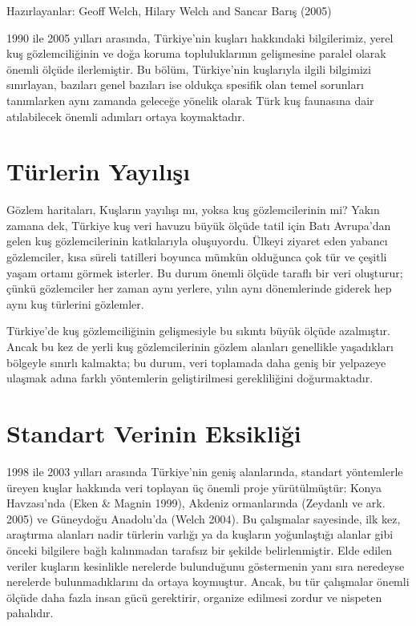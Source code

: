 \documentclass[
  a4paper,
  DIV=11,
  numbers=noendperiod]{scrartcl}
\begin{document}

Hazırlayanlar: Geoff Welch, Hilary Welch and Sancar Barış (2005)

1990 ile 2005 yılları arasında, Türkiye'nin kuşları hakkındaki
bilgilerimiz, yerel kuş gözlemciliğinin ve doğa koruma topluluklarının
gelişmesine paralel olarak önemli ölçüde ilerlemiştir. Bu bölüm,
Türkiye'nin kuşlarıyla ilgili bilgimizi sınırlayan, bazıları genel
bazıları ise oldukça spesifik olan temel sorunları tanımlarken aynı
zamanda geleceğe yönelik olarak Türk kuş faunasına dair atılabilecek
önemli adımları ortaya koymaktadır.

\section*{Türlerin Yayılışı}\label{tuxfcrlerin-yayux131lux131ux15fux131}


Gözlem haritaları, Kuşların yayılışı mı, yoksa kuş gözlemcilerinin mi?
Yakın zamana dek, Türkiye kuş veri havuzu büyük ölçüde tatil için Batı
Avrupa'dan gelen kuş gözlemcilerinin katkılarıyla oluşuyordu. Ülkeyi
ziyaret eden yabancı gözlemciler, kısa süreli tatilleri boyunca mümkün
olduğunca çok tür ve çeşitli yaşam ortamı görmek isterler. Bu durum
önemli ölçüde taraflı bir veri oluşturur; çünkü gözlemciler her zaman
aynı yerlere, yılın aynı dönemlerinde giderek hep aynı kuş türlerini
gözlemler.

Türkiye'de kuş gözlemciliğinin gelişmesiyle bu sıkıntı büyük ölçüde
azalmıştır. Ancak bu kez de yerli kuş gözlemcilerinin gözlem alanları
genellikle yaşadıkları bölgeyle sınırlı kalmakta; bu durum, veri
toplamada daha geniş bir yelpazeye ulaşmak adına farklı yöntemlerin
geliştirilmesi gerekliliğini doğurmaktadır.

\section*{Standart Verinin
Eksikliği}\label{standart-verinin-eksikliux11fi}


1998 ile 2003 yılları arasında Türkiye'nin geniş alanlarında, standart
yöntemlerle üreyen kuşlar hakkında veri toplayan üç önemli proje
yürütülmüştür: Konya Havzası'nda (Eken \& Magnin 1999), Akdeniz
ormanlarında (Zeydanlı ve ark. 2005) ve Güneydoğu Anadolu'da (Welch
2004). Bu çalışmalar sayesinde, ilk kez, araştırma alanları nadir
türlerin varlığı ya da kuşların yoğunlaştığı alanlar gibi önceki
bilgilere bağlı kalınmadan tarafsız bir şekilde belirlenmiştir. Elde
edilen veriler kuşların kesinlikle nerelerde bulunduğunu göstermenin
yanı sıra neredeyse nerelerde bulunmadıklarını da ortaya koymuştur.
Ancak, bu tür çalışmalar önemli ölçüde daha fazla insan gücü gerektirir,
organize edilmesi zordur ve nispeten pahalıdır.
\end{document}
